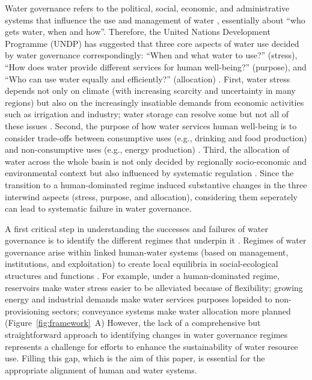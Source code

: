\documentclass[draft]{../agujournal2019}
\begin{document}
Water governance refers to the political, social, economic, and administrative systems that influence the use and management of water \cite{oecd2018, wang2017}, essentially about ``who gets water, when and how''\cite{lasswell2018}.
Therefore, the United Nations Development Programme (UNDP) has suggested that three core aspects of water use decided by water governance correspondingly: ``When and what water to use?'' (stress), ``How does water provide different services for human well-being?'' (purpose), and ``Who can use water equally and efficiently?'' (allocation)
\cite{undpwatergovernancefacility2016}.
First, water stress depends not only on climate (with increasing scarcity and uncertainty in many regions) but also on the increasingly insatiable demands from economic activities such as irrigation and industry; water storage can resolve some but not all of these issues
\cite{qin2019,wada2014,huang2021}.
Second, the purpose of how water services human well-being is to consider trade-offs between consumptive uses (e.g., drinking and food production) and non-consumptive uses (e.g., energy production)
\cite{liu2017,florke2018,jaeger2019}.
Third, the allocation of water across the whole basin is not only decided by regionally socio-economic and environmental context but also influenced by systematic regulation
\cite{schmandt2021,speed2013}.
Since the transition to a human-dominated regime induced substantive changes in the three interwind aspects (stress, purpose, and allocation), considering them seperately can lead to systematic failure in water governance.

A first critical step in understanding the successes and failures of water governance is to identify the different regimes that underpin it \cite{kjellen2015, grafton2013}.
Regimes of water governance arise within linked human-water systems (based on management, institutions, and exploitation) to create local equilibria in social-ecological structures and functions
\cite{falkenmark2021,bressers2013,loch2020}.
For example, under a human-dominated regime, reservoirs make water stress easier to be alleviated because of flexibility; growing energy and industrial demands make water services purposes lopsided to non-provisioning sectors; conveyance systems make water allocation more planned (Figure~\ref{fig:framework}~A)
However, the lack of a comprehensive but straightforward approach to identifying changes in water governance regimes represents a challenge for efforts to enhance the sustainability of water resource use.
Filling this gap, which is the aim of this paper, is essential for the appropriate alignment of human and water systems.
\end{document}
